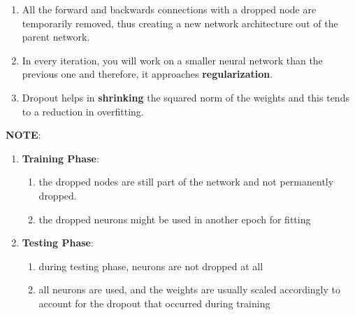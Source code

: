 \begin{enumerate}
    \item All the forward and backwards connections with a dropped node are temporarily removed, thus creating a new network architecture out of the parent network. 
    
    \item In every iteration, you will work on a smaller neural network than the previous one and therefore, it approaches \textbf{regularization}.

    \item Dropout helps in \textbf{shrinking} the squared norm of the weights and this tends to a reduction in overfitting.

\end{enumerate}

\vspace{0.3cm}
\noindent\textbf{NOTE}:
\begin{enumerate}[itemsep=0.2cm]
    \item \textbf{Training Phase}:
    \begin{enumerate}
        \item the dropped nodes are still part of the network and not permanently dropped. 
    
        \item the dropped neurons might be used in another epoch for fitting
    \end{enumerate}

    \item \textbf{Testing Phase}:
    \begin{enumerate}
        \item during testing phase, neurons are not dropped at all

        \item all neurons are used, and the weights are usually scaled accordingly to account for the dropout that occurred during training
    \end{enumerate}
\end{enumerate}
















